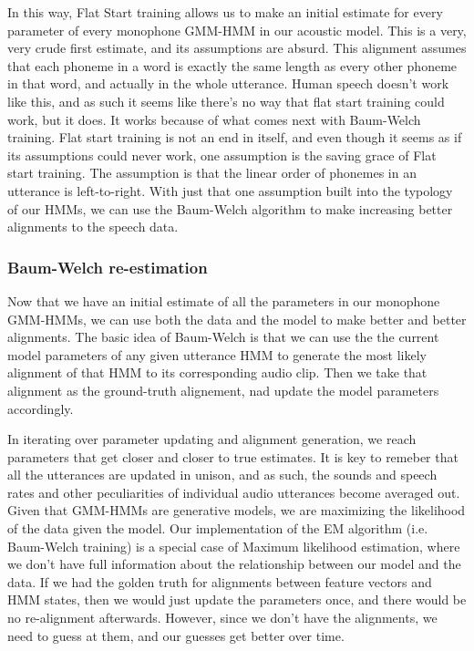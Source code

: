 \documentclass[10pt,a4paper]{article}
\begin{document}
In this way, Flat Start training allows us to make an initial estimate for every parameter of every monophone GMM-HMM in our acoustic model. This is a very, very crude first estimate, and its assumptions are absurd. This alignment assumes that each phoneme in a word is exactly the same length as every other phoneme in that word, and actually in the whole utterance. Human speech doesn't work like this, and as such it seems like there's no way that flat start training could work, but it does. It works because of what comes next with Baum-Welch training. Flat start training is not an end in itself, and even though it seems as if its assumptions could never work, one assumption is the saving grace of Flat start training. The assumption is that the linear order of phonemes in an utterance is left-to-right. With just that one assumption built into the typology of our HMMs, we can use the Baum-Welch algorithm to make increasing better alignments to the speech data.

\subsubsection*{Baum-Welch re-estimation}

Now that we have an initial estimate of all the parameters in our monophone GMM-HMMs, we can use both the data and the model to make better and better alignments. The basic idea of Baum-Welch is that we can use the the current model parameters of any given utterance HMM to generate the most likely alignment of that HMM to its corresponding audio clip. Then we take that alignment as the ground-truth alignement, nad update the model parameters accordingly.

In iterating over parameter updating and alignment generation, we reach parameters that get closer and closer to true estimates. It is key to remeber that all the utterances are updated in unison, and as such, the sounds and speech rates and other peculiarities of individual audio utterances become averaged out. Given that GMM-HMMs are generative models, we are maximizing the likelihood of the data given the model. Our implementation of the EM algorithm (i.e. Baum-Welch training) is a special case of Maximum likelihood estimation, where we don't have full information about the relationship between our model and the data. If we had the golden truth for alignments between feature vectors and HMM states, then we would just update the parameters once, and there would be no re-alignment afterwards. However, since we don't have the alignments, we need to guess at them, and our guesses get better over time.
\end{document}
